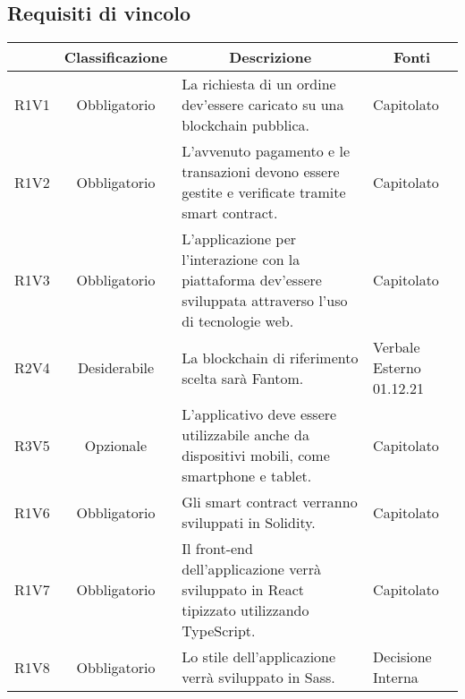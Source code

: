 \subsection{Requisiti di vincolo} \label{subsection:requisiti_vincolo}
\begin{table}[H]
    \centering
    \renewcommand{\arraystretch}{1.8}
    \begin{tabular}{c | c | p{6cm} | p{4.1cm}}
        \rowcolor[HTML]{125E28}
        \multicolumn{1}{c}{\color[HTML]{FFFFFF} \textbf{Codice}}          &
        \multicolumn{1}{c}{\color[HTML]{FFFFFF} \textbf{Classificazione}} &
        \multicolumn{1}{c}{\color[HTML]{FFFFFF} \textbf{Descrizione}}     &
        \multicolumn{1}{c}{\color[HTML]{FFFFFF} \textbf{Fonti}}                                                                                                                                                                     \\
        \hline
        R1V1                                                              & Obbligatorio & La richiesta di un ordine dev'essere caricato su una blockchain\glo{} pubblica.                               & Capitolato               \\
        R1V2                                                              & Obbligatorio & L'avvenuto pagamento e le transazioni devono essere gestite e verificate tramite smart contract\glo{}.        & Capitolato               \\
        R1V3                                                              & Obbligatorio & L'applicazione per l'interazione con la piattaforma dev'essere sviluppata attraverso l'uso di tecnologie web. & Capitolato               \\
        R2V4                                                              & Desiderabile & La blockchain\glo{} di riferimento scelta sarà Fantom\glo{}.                                                  & Verbale Esterno 01.12.21 \\
        R3V5                                                              & Opzionale    & L'applicativo deve essere utilizzabile anche da dispositivi mobili, come smartphone e tablet.                 & Capitolato               \\
        R1V6                                                              & Obbligatorio & Gli smart contract\glo{} verranno sviluppati in Solidity\glo{}.                                               & Capitolato               \\
        R1V7                                                              & Obbligatorio & Il front-end\glo{} dell'applicazione verrà sviluppato in React\glo{} tipizzato utilizzando TypeScript\glo{}.  & Capitolato               \\
        R1V8                                                              & Obbligatorio & Lo stile dell'applicazione verrà sviluppato in Sass\glo{}.                                                    & Decisione Interna        \\
    \end{tabular}
\end{table}
